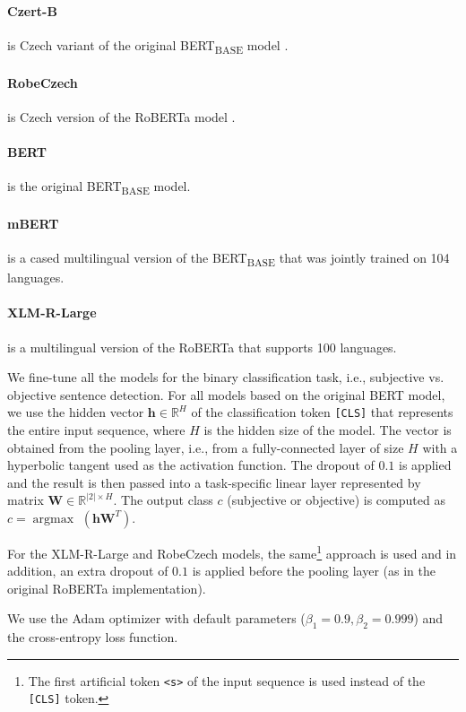 \documentclass[10pt, a4paper]{article}
\renewcommand{\vec}[1]{\ensuremath{\mathbf{#1}}}
\DeclareMathOperator*{\argmax}{argmax~}
\begin{document}
\paragraph{Czert-B} \cite{czert} is Czech variant of  the original BERT\textsubscript{BASE} model \cite{devlin-etal-2019-bert}.

\paragraph{RobeCzech} \cite{straka2021robeczech} is Czech version of the RoBERTa model \cite{liu2019roberta}.

\paragraph{BERT} \cite{devlin-etal-2019-bert} is the original BERT\textsubscript{BASE} model.

\paragraph{mBERT} \cite{devlin-etal-2019-bert} is a cased multilingual version of the BERT\textsubscript{BASE} that was jointly trained on 104 languages. 

\paragraph{XLM-R-Large} \cite{xlm-r} is a multilingual version of the RoBERTa \cite{liu2019roberta} that supports 100 languages.

We fine-tune all the models for the binary classification task, i.e., subjective vs. objective sentence detection. For all models based on the original BERT model, we use the hidden vector $\vec{h} \in \mathbb{R}^H$ of the classification token \texttt{[CLS]} that represents the entire input sequence, where $H$ is the hidden size of the model. The vector is obtained from the pooling layer, i.e., from a fully-connected layer of size $H$ with a hyperbolic tangent used as the activation function. The dropout of $0.1$ is  applied and the result is then passed into a task-specific linear layer represented by matrix $\vec{W} \in \mathbb{R}^{|2| \times H}$. The output class $c$ (subjective or objective) is computed as
$c = \argmax(\vec{h}\vec{W}^{T})$.

\par For the XLM-R-Large and RobeCzech models, the same\footnote{The first artificial token \texttt{<s>} of the input sequence is used instead of the \texttt{[CLS]} token.} approach is used and in addition, an extra dropout of $0.1$ is applied before the pooling layer (as in the original RoBERTa implementation).
\par We use the Adam \cite{Kingma-adam} optimizer with default parameters ($\beta_1 = 0.9, \beta_2 = 0.999$) and the cross-entropy loss function.
\end{document}
